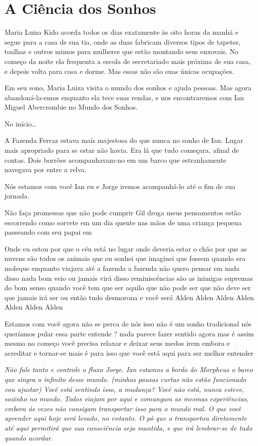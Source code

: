 \chapter{A Ciência dos Sonhos}


Maria Luiza Kido acorda todos os dias exatamente às oito horas da manhã
e segue para a casa de sua tia, onde as duas fabricam diversos tipos de
tapetes, toalhas e outros mimos para mulheres que estão montando seus
enxovais. No começo da noite ela frequenta a escola de secretariado mais
próxima de sua casa, e depois volta para casa e dorme.  Mas essas não
são suas únicas ocupações.

Em seu sono, Maria Luiza visita o mundo dos sonhos e ajuda pessoas. Mas
agora abandoná-la-emos enquanto ela tece suas rendas, e nos
encontraremos com Ian Miguel Abercrombie no Mundo dos Sonhos.

No início\ldots

A Fazenda Ferraz estava mais majestosa do que nunca no sonho de Ian.
Lugar mais apropriado para se estar não havia. Era lá que tudo começara,
afinal de contas. Dois borrões acompanhavam-no em um barco que
estranhamente navegava por entre a relva.

Nós estamos com você Ian eu e Jorge iremos acompanhá-lo até o fim de sua
jornada.

Não faça promessas que não pode cumprir Gil droga meus pensamentos estão
escorrendo como sorvete em um dia quente nas mãos de uma criança pequena
passeando com seu papai em

Onde eu estou por que o céu está no lugar onde deveria estar o chão por
que as nuvens são todos os animais que eu sonhei que imaginei que fossem
quando era moleque enquanto viajava até a fazenda a fazenda não quero
pensar em nada disso nada bom veio ou jamais virá disso reminiscências
são as inimigas supremas do bom senso quando você tem que ser aquilo que
não pode ser que não deve ser que jamais irá ser ou então tudo desmorona
e você será Alden Alden Alden Alden Alden Alden Alden

Estamos com você agora não se perca de nós isso não é um sonho
tradicional nós queríamos pular essa parte entende ? nada parece fazer
sentido agora mas é assim mesmo no começo você precisa relaxar e deixar
seus medos irem embora e acreditar e tornar-se mais é para isso que você
está aqui para ser melhor entender

\emph{Não fale tanto e controle o fluxo Jorge. Ian estamos a bordo do
Morpheus o barco que singra o infinito desse mundo. (minhas pausas
curtas não estão funcionado vou ajustar) Você está sentindo isso, a
mudança? Você não está, nunca esteve, sozinho no mundo. Todos viajam por
aqui e comungam as mesmas experiências, embora ás vezes não consigam
transportar isso para o mundo real. O que você aprender aqui hoje será
levado, no entanto. O pó que o transportou diretamente até aqui
permitirá que sua consciência seja mantida, e que irá lembrar-se de tudo
quando acordar.}

